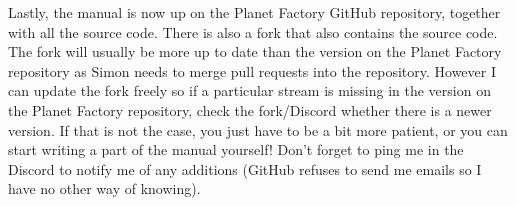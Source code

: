 \documentclass{article}
\begin{document}
Lastly, the manual is now up on the Planet Factory GitHub repository\cite{claudeGit}, together with all the source code. There is also a fork \cite{nomGit} that also contains the source code. 
The fork will usually be more up to date than the version on the Planet Factory repository as Simon needs to merge pull requests into the repository. However I can update the fork freely so if a 
particular stream is missing in the version on the Planet Factory repository, check the fork/Discord whether there is a newer version. If that is not the case, you just have to be a bit more 
patient, or you can start writing a part of the manual yourself! Don't forget to ping me in the Discord to notify me of any additions (GitHub refuses to send me emails so I have no other way of 
knowing).

























\newpage


\newpage


\end{document}
